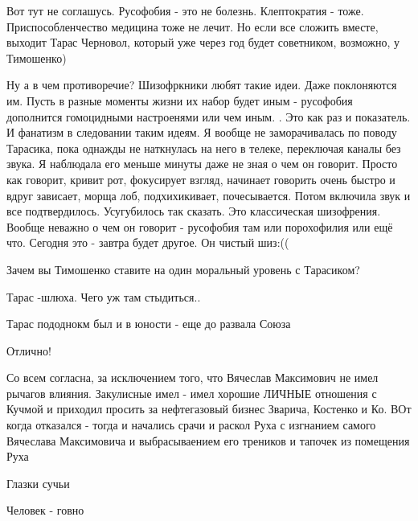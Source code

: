 \begin{itemize}
\begin{itemize} %

Вот тут не соглашусь. Русофобия - это не болезнь. Клептократия - тоже.
Приспособленчество медицина тоже не лечит. Но если все сложить вместе, выходит
Тарас Черновол, который уже через год будет советником, возможно, у Тимошенко)


Ну а в чем противоречие? Шизофркники любят такие идеи. Даже поклоняются им.
Пусть в разные моменты жизни их набор будет иным - русофобия дополнится
гомоцидными настроенями или чем иным. . Это как раз и показатель. И фанатизм в
следовании таким идеям. Я вообще не заморачивалась по поводу Тарасика, пока
однажды не наткнулась на него в телеке, переключая каналы без звука. Я
наблюдала его меньше минуты даже не зная о чем он говорит. Просто как говорит,
кривит рот, фокусирует взгляд, начинает говорить очень быстро и вдруг зависает,
морща лоб, подхихикивает, почесывается. Потом включила звук и все
подтвердилось. Усугубилось так сказать. Это классическая шизофрения. Вообще
неважно о чем он говорит - русофобия там или порохофилия или ещё что. Сегодня
это - завтра будет другое. Он чистый шиз:((


Зачем вы Тимошенко ставите на один моральный уровень с Тарасиком?

\end{itemize} %

Тарас -шлюха. Чего уж там стыдиться..

\begin{itemize} %

Тарас пододнокм был и в юности - еще до развала Союза
\end{itemize} %

Отлично!



Со всем согласна, за исключением того, что Вячеслав Максимович не имел рычагов
влияния. Закулисные имел - имел хорошие ЛИЧНЫЕ отношения с Кучмой и приходил
просить за нефтегазовый бизнес Зварича, Костенко и Ко. ВОт когда отказался -
тогда и начались срачи и раскол Руха с изгнанием самого Вячеслава Максимовича и
выбрасываением его треников и тапочек из помещения Руха


Глазки сучьи

Человек - говно


\end{itemize}
